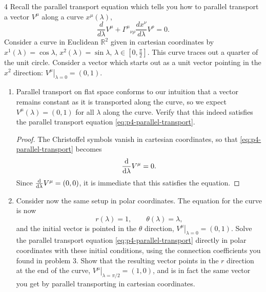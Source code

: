 \documentclass[11pt]{article}
\begin{document}
\begin{problem}{4}
	Recall the parallel transport equation which tells you how to parallel transport a vector \(V^\mu\) along a curve \(x^\mu(\lambda)\),
	\begin{equation}
		\label{eq:p4-parallel-transport}
		\frac{d}{d\lambda}V^\mu+\Gamma^\mu{}_{\nu\rho}\frac{dx^\nu}{d\lambda}V^\rho=0.
	\end{equation}
	Consider a curve in Euclidean \(\mathbb{R}^2\) given in cartesian coordinates by \(x^1(\lambda)=\cos\lambda\), \(x^2(\lambda)=\sin\lambda\), \(\lambda\in[0,\frac\pi2]\).
	This curve traces out a quarter of the unit circle.
	Consider a vector which starts out as a unit vector pointing in the \(x^2\) direction: \(\left.V^\mu\right|_{\lambda=0}=(0,1)\).
	\begin{enumerate}[label=(\alph*)]
		\item Parallel transport on flat space conforms to our intuition that a vector remains constant as it is transported along the curve, so we expect \(V^\mu(\lambda)=(0,1)\) for all \(\lambda\) along the curve.
		      Verify that this indeed satisfies the parallel transport equation \cref{eq:p4-parallel-transport}.
          \begin{proof}
            The Christoffel symbols vanish in cartesian coordinates, so that \cref{eq:p4-parallel-transport} becomes
            \begin{equation}
            \label{eq:17}
            \dv{\lambda}V^{\mu} = 0.
          \end{equation}
          Since \( \dv{\lambda}V^{\mu} = (0,0) \), it is immediate that this satisfies the equation.
          \end{proof}
		\item Consider now the same setup in polar coordinates.
		      The equation for the curve is now
		      \begin{equation}
			      \label{eq:p4-polar-curve}
			      r(\lambda)=1,\qquad\theta(\lambda)=\lambda,
		      \end{equation}
		      and the initial vector is pointed in the \(\theta\) direction, \(\left.V^\mu\right|_{\lambda=0}=(0,1)\).
		      Solve the parallel transport equation \cref{eq:p4-parallel-transport} directly in polar coordinates with these initial conditions, using the connection coefficients you found in problem 3.
		      Show that the resulting vector points in the \(r\) direction at the end of the curve, \(\left.V^\mu\right|_{\lambda=\pi/2}=(1,0)\), and is in fact the same vector you get by parallel transporting in cartesian coordinates.

\end{enumerate}
\end{problem}
\end{document}
